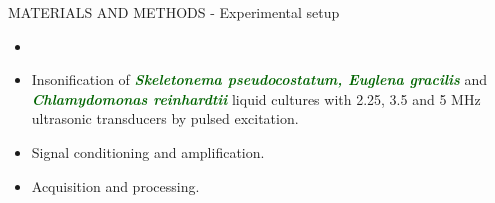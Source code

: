 \documentclass[handout]{beamer}
\newcommand\Fontable{\fontsize{9}{10}\selectfont}
\begin{document}
\begin{frame}{MATERIALS AND METHODS - Experimental setup}
\Fontable
\begin{itemize}
\item []
\item<2-> Insonification of \textcolor{darkgreen}{{\bf \textit{Skeletonema pseudocostatum, Euglena gracilis}}} and \textcolor{darkgreen}{{\bf \textit{Chlamydomonas reinhardtii}}} liquid cultures with 2.25, 3.5 and 5 MHz ultrasonic transducers by pulsed excitation.
\item<3-> Signal conditioning and amplification.
\item<4-> Acquisition and processing.
\end{itemize}



\end{frame}
\end{document}
